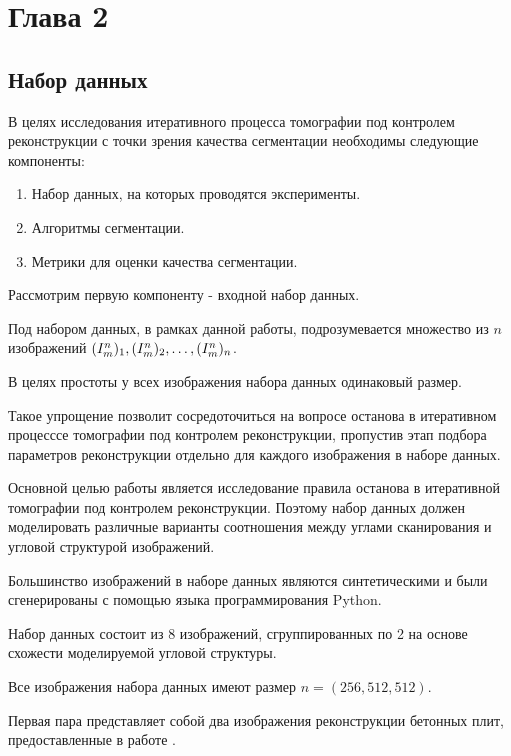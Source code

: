 \section{Глава 2}

\subsection{Набор данных}

В целях исследования итеративного процесса томографии под контролем реконструкции с точки зрения качества сегментации необходимы следующие компоненты:
\begin{enumerate}

    \item Набор данных, на которых проводятся эксперименты.
    \item Алгоритмы сегментации.
    \item Метрики для оценки качества сегментации.
        
\end{enumerate}   

Рассмотрим первую компоненту - входной набор данных.

Под набором данных, в рамках данной работы, подрозумевается множество из \(n\) изображений \( (I^n_m)_1, (I^n_m)_2, \ldots, (I^n_m)_n \). 

В целях простоты у всех изображения набора данных одинаковый размер.

Такое упрощение позволит сосредоточиться на вопросе останова в итеративном процесссе томографии под контролем реконструкции, пропустив этап подбора параметров реконструкции отдельно для каждого изображения в наборе данных.

Основной целью работы является исследование правила останова в итеративной томографии под контролем реконструкции. Поэтому набор данных должен моделировать различные варианты соотношения между углами сканирования и угловой структурой изображений.

Большинство изображений  в наборе данных являются синтетическими и были сгенерированы с помощью языка программирования Python.

Набор данных состоит из 8 изображений, сгруппированных по 2 на основе схожести моделируемой угловой структуры.

Все изображения набора данных имеют размер \(n = (256, 512, 512)\).

Первая пара представляет собой два изображения реконструкции бетонных плит, предоставленные в работе \cite{wagner2023comparative}.

